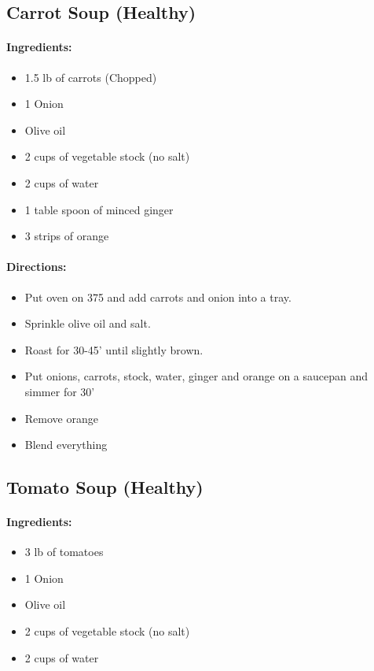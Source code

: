 \documentclass{article}
\begin{document}
\subsection{Carrot Soup (Healthy)}

\paragraph{Ingredients:}
\begin{itemize}
	\item 1.5 lb of carrots (Chopped)
	\item 1 Onion
	\item Olive oil
	\item 2 cups of vegetable stock (no salt)
	\item 2 cups of water
	\item 1 table spoon of minced ginger
	\item 3 strips of orange
\end{itemize}

\paragraph{Directions:}
\begin{itemize}
	\item Put oven on 375 and add carrots and onion into a tray.
	\item Sprinkle olive oil and salt.
	\item Roast for 30-45' until slightly brown.
	\item Put onions, carrots, stock, water, ginger and orange on a saucepan and simmer for 30'
	\item Remove orange
	\item Blend everything
\end{itemize}

\subsection{Tomato Soup (Healthy)}

\paragraph{Ingredients:}
\begin{itemize}
	\item 3 lb of tomatoes
	\item 1 Onion
	\item Olive oil
	\item 2 cups of vegetable stock (no salt)
	\item 2 cups of water
\end{itemize}
\end{document}
